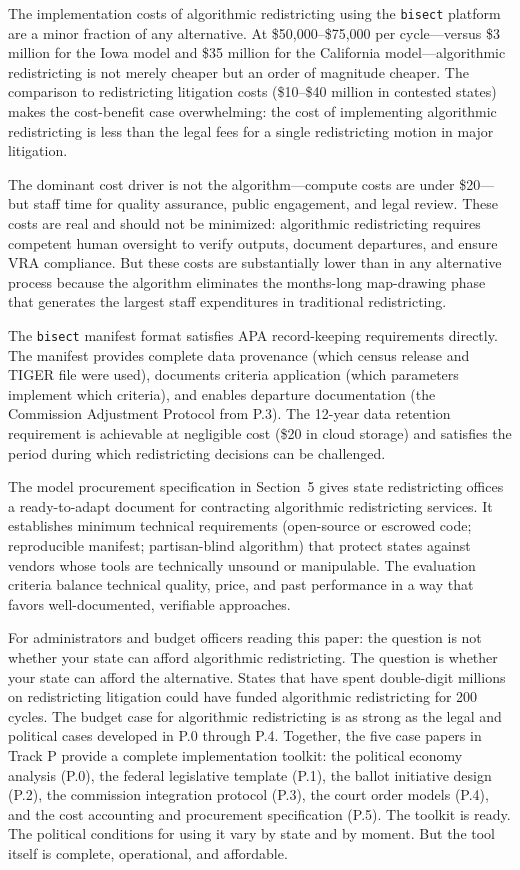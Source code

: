 The implementation costs of algorithmic redistricting using the \texttt{bisect} platform are a minor fraction of any alternative. At \$50,000--\$75,000 per cycle---versus \$3 million for the Iowa model and \$35 million for the California model---algorithmic redistricting is not merely cheaper but an order of magnitude cheaper. The comparison to redistricting litigation costs (\$10--\$40 million in contested states) makes the cost-benefit case overwhelming: the cost of implementing algorithmic redistricting is less than the legal fees for a single redistricting motion in major litigation.

The dominant cost driver is not the algorithm---compute costs are under \$20---but staff time for quality assurance, public engagement, and legal review. These costs are real and should not be minimized: algorithmic redistricting requires competent human oversight to verify outputs, document departures, and ensure VRA compliance. But these costs are substantially lower than in any alternative process because the algorithm eliminates the months-long map-drawing phase that generates the largest staff expenditures in traditional redistricting.

The \texttt{bisect} manifest format satisfies APA record-keeping requirements directly. The manifest provides complete data provenance (which census release and TIGER file were used), documents criteria application (which parameters implement which criteria), and enables departure documentation (the Commission Adjustment Protocol from P.3). The 12-year data retention requirement is achievable at negligible cost (\$20 in cloud storage) and satisfies the period during which redistricting decisions can be challenged.

The model procurement specification in Section~5 gives state redistricting offices a ready-to-adapt document for contracting algorithmic redistricting services. It establishes minimum technical requirements (open-source or escrowed code; reproducible manifest; partisan-blind algorithm) that protect states against vendors whose tools are technically unsound or manipulable. The evaluation criteria balance technical quality, price, and past performance in a way that favors well-documented, verifiable approaches.

For administrators and budget officers reading this paper: the question is not whether your state can afford algorithmic redistricting. The question is whether your state can afford the alternative. States that have spent double-digit millions on redistricting litigation could have funded algorithmic redistricting for 200 cycles. The budget case for algorithmic redistricting is as strong as the legal and political cases developed in P.0 through P.4. Together, the five case papers in Track P provide a complete implementation toolkit: the political economy analysis (P.0), the federal legislative template (P.1), the ballot initiative design (P.2), the commission integration protocol (P.3), the court order models (P.4), and the cost accounting and procurement specification (P.5). The toolkit is ready. The political conditions for using it vary by state and by moment. But the tool itself is complete, operational, and affordable.

